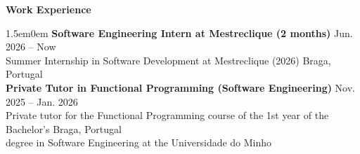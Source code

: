 \noindent\textbf{Work Experience}
\noindent\hrulefill
\vspace{0.25em}
\begin{adjustwidth}{1.5em}{0em}
\textbf{Software Engineering Intern at Mestreclique (2 months)} \hfill Jun. 2026 -- Now \\
Summer Internship in Software Development at Mestreclique (2026) \hfill Braga, Portugal
\vspace{0.5em}
\\
\textbf{Private Tutor in Functional Programming (Software Engineering)} \hfill Nov. 2025 -- Jan. 2026 \\
Private tutor for the Functional Programming course of the 1st year of the
Bachelor's  \hfill Braga, Portugal \\
degree in Software Engineering at the Universidade
do Minho
\end{adjustwidth}
\vspace{0.25em}